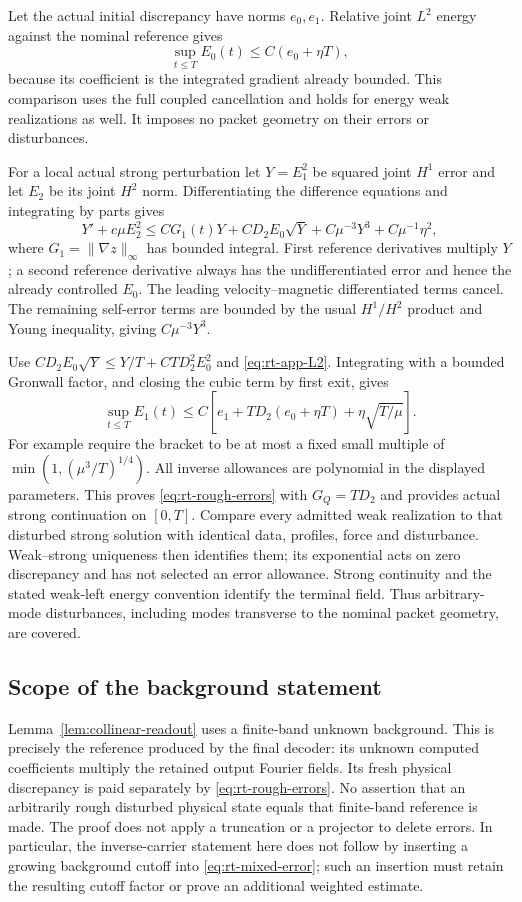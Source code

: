 \documentclass[11pt,a4paper]{amsart}
\theoremstyle{definition}
\theoremstyle{remark}
\numberwithin{equation}{section}
\newcommand{\norm}[1]{\lVert #1\rVert}
\begin{document}
Let the actual initial discrepancy have norms $e_0,e_1$.  Relative
joint $L^2$ energy against the nominal reference gives
\begin{equation}\label{eq:rt-app-L2}
 \sup_{t\le T}E_0(t)\le C(e_0+\eta T),
\end{equation}
because its coefficient is the integrated gradient already bounded.
This comparison uses the full coupled cancellation and holds for
energy weak realizations as well.  It imposes no packet geometry on
their errors or disturbances.

For a local actual strong perturbation let
$Y=E_1^2$ be squared joint $H^1$ error and let $E_2$ be its joint
$H^2$ norm.  Differentiating the difference equations and integrating
by parts gives
\begin{equation}\label{eq:rt-app-H1}
 Y'+c\mu E_2^2
 \le CG_1(t)Y+CD_2E_0\sqrt Y
                    +C\mu^{-3}Y^3+C\mu^{-1}\eta^2,
\end{equation}
where $G_1=\norm{\nabla z}_\infty$ has bounded integral.  First
reference derivatives multiply $Y$; a second reference derivative
always has the undifferentiated error and hence the already controlled
$E_0$.  The leading velocity--magnetic differentiated terms cancel.
The remaining self-error terms are bounded by the usual
$H^1/H^2$ product and Young inequality, giving $C\mu^{-3}Y^3$.

Use $CD_2E_0\sqrt Y\le Y/T+CTD_2^2E_0^2$ and
\eqref{eq:rt-app-L2}.  Integrating with a bounded Gronwall factor,
and closing the cubic term by first exit, gives
\[
 \sup_{t\le T}E_1(t)
 \le C[e_1+TD_2(e_0+\eta T)+\eta\sqrt{T/\mu}].
\]
For example require the bracket to be at most a fixed small multiple
of $\min(1,(\mu^3/T)^{1/4})$.  All inverse allowances are polynomial
in the displayed parameters.  This proves \eqref{eq:rt-rough-errors}
with $G_Q=TD_2$ and provides actual strong continuation on $[0,T]$.
Compare every admitted weak realization to that disturbed strong
solution with identical data, profiles, force and disturbance.
Weak--strong uniqueness then identifies them; its exponential acts on
zero discrepancy and has not selected an error allowance.  Strong
continuity and the stated weak-left energy convention identify the
terminal field.  Thus arbitrary-mode disturbances, including modes
transverse to the nominal packet geometry, are covered.

\subsection{Scope of the background statement}
Lemma~\ref{lem:collinear-readout} uses a finite-band unknown background.
This is precisely the reference produced by the final decoder: its
unknown computed coefficients multiply the retained output Fourier
fields.  Its fresh physical discrepancy is paid separately by
\eqref{eq:rt-rough-errors}.  No assertion that an arbitrarily rough
disturbed physical state equals that finite-band reference is made.
The proof does not apply a truncation or a projector to delete errors.
In particular, the inverse-carrier statement here does not follow by
inserting a growing background cutoff into
\eqref{eq:rt-mixed-error}; such an insertion must retain the resulting
cutoff factor or prove an additional weighted estimate.
\end{document}
